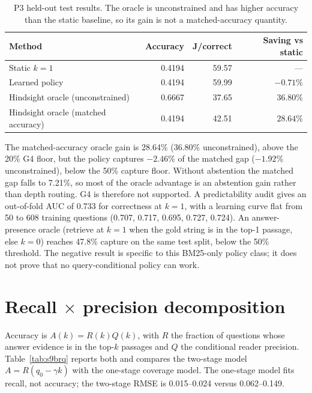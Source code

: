 \begin{table}[pos=htbp]
  \centering
  \caption{P3 held-out test results. The oracle is unconstrained and has higher
  accuracy than the static baseline, so its gain is not a matched-accuracy
  quantity.}
  \label{tab:s9policy}
  \footnotesize
  \begin{tabular}{@{}lrrr@{}}
    \toprule
    \textbf{Method} & \textbf{Accuracy} & \textbf{J/correct} & \textbf{Saving vs static} \\
    \midrule
    Static $k=1$ & 0.4194 & 59.57 & — \\
    Learned policy & 0.4194 & 59.99 & $-0.71\%$ \\
    Hindsight oracle (unconstrained) & 0.6667 & 37.65 & $36.80\%$ \\
    Hindsight oracle (matched accuracy) & 0.4194 & 42.51 & $28.64\%$ \\
    \bottomrule
  \end{tabular}
\end{table}

The matched-accuracy oracle gain is 28.64\% (36.80\% unconstrained), above the
20\% G4 floor, but the policy captures $-2.46\%$ of the matched gap
($-1.92\%$ unconstrained), below the 50\% capture floor. Without abstention the
matched gap falls to 7.21\%, so most of the oracle advantage is an abstention
gain rather than depth routing. G4 is therefore not supported. A predictability audit gives an out-of-fold AUC
of 0.733 for correctness at $k=1$, with a learning curve flat from 50 to 608
training questions (0.707, 0.717, 0.695, 0.727, 0.724). An answer-presence
oracle (retrieve at $k=1$ when the gold string is in the top-1 passage, else
$k=0$) reaches 47.8\% capture on the same test split, below the 50\% threshold.
The negative result is specific to this BM25-only policy class; it does not
prove that no query-conditional policy can work.

\section{Recall $\times$ precision decomposition}\label{sec:s9b}

Accuracy is $A(k)=R(k)Q(k)$, with $R$ the fraction of questions whose answer
evidence is in the top-$k$ passages and $Q$ the conditional reader precision.
Table~\ref{tab:s9brq} reports both and compares the two-stage model
$A=R(q_0-\gamma k)$ with the one-stage coverage model. The one-stage model fits
recall, not accuracy; the two-stage RMSE is 0.015--0.024 versus 0.062--0.149.

